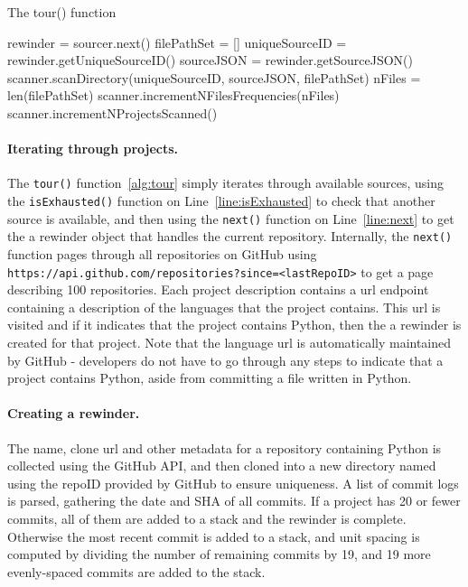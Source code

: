 \begin{algorithm}
  \caption{The tour() function}\label{alg:tour}
  \begin{algorithmic}[1]
 \label{line:isExhausted}
    \State rewinder = sourcer.next() \label{line:next}
    \State filePathSet = []
    \State uniqueSourceID = rewinder.getUniqueSourceID()
    \State sourceJSON = rewinder.getSourceJSON()
     \label{line:rewind}
        \State scanner.scanDirectory(uniqueSourceID, sourceJSON, filePathSet)\label{line:scanDirectory}
    \EndWhile
    \State nFiles = len(filePathSet)
    \State scanner.incrementNFilesFrequencies(nFiles)\label{line:fileFrequencies}
    \State scanner.incrementNProjectsScanned()\label{line:projectScannedCount}
\EndWhile
\end{algorithmic}
\end{algorithm}

\paragraph{Iterating through projects.} The {\tt tour()} function~\ref{alg:tour} simply iterates through available sources, using the {\tt isExhausted()} function on Line~\ref{line:isExhausted} to check that another source is available, and then using the {\tt next()} function on Line~\ref{line:next} to get the a rewinder object that handles the current repository.  Internally, the {\tt next()} function pages through all repositories on GitHub using {\tt https://api.github.com/repositories?since=<lastRepoID>} to get a page describing 100 repositories.  Each project description contains a url endpoint containing a description of the languages that the project contains.  This url is visited and if it indicates that the project contains Python, then the a rewinder is created for that project.  Note that the language url is automatically maintained by GitHub - developers do not have to go through any steps to indicate that a project contains Python, aside from committing a file written in Python.

\paragraph{Creating a rewinder.}  The name, clone url and other metadata for a repository containing Python is collected using the GitHub API, and then cloned into a new directory named using the repoID provided by GitHub to ensure uniqueness.  A list of commit logs is parsed, gathering the date and SHA of all commits.  If a project has 20 or fewer commits, all of them are added to a stack and the rewinder is complete.  Otherwise the most recent commit is added to a stack, and unit spacing is computed by dividing the number of remaining commits by 19, and 19 more evenly-spaced commits are added to the stack.

